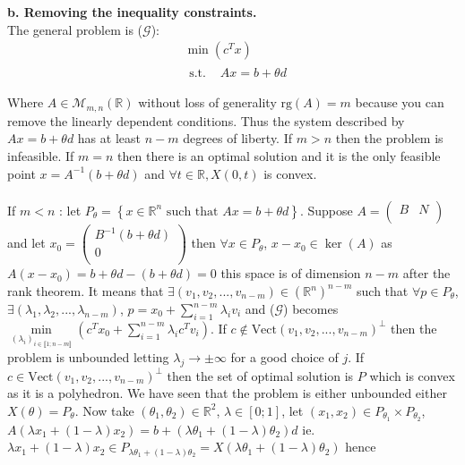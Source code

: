\documentclass{article}
\begin{document}
\textbf{b. Removing the inequality constraints.}\\
The general problem is ($\mathcal{G}$): \begin{equation*}
    \begin{split}
        &\min(c^Tx)\\
        &\begin{split}
            \text{s.t. }& Ax = b+\theta d\\
        \end{split}\\
    \end{split}
\end{equation*}
Where $A\in\mathcal{M}_{m,n}(\mathbb{R})$ without loss of generality $\text{rg}(A) = m$ because you can remove the linearly dependent conditions. Thus the system described by $Ax = b+\theta d$ has at least $n-m$ degrees of liberty. If $m>n$ then the problem is infeasible. If $m=n$ then there is an optimal solution and it is the only feasible point $x = A^{-1}(b+\theta d)$ and $\forall t\in\mathbb{R}, X(0,t)$ is convex.
\\\\
If $m<n$ : let $P_\theta = \left\{x\in\mathbb{R}^n\text{ such that } Ax = b+\theta d\right\}$. Suppose $A = \left(\begin{array}{cc}
    B&N\\
 \end{array}\right)$ and let $x_0 = \left(\begin{array}{c}B^{-1}(b+\theta d)\\0\\\end{array}\right)$ then $\forall x\in P_\theta$, $x-x_0 \in \ker(A)$ as $A(x-x_0) = b+\theta d - (b+\theta d) = 0$ this space is of dimension $n-m$ after the rank theorem. It means that $\exists (v_1,v_2,...,v_{n-m})\in(\mathbb{R}^n)^{n-m}$ such that $\forall p\in P_\theta$, $\exists(\lambda_1,\lambda_2,...,\lambda_{n-m})$, $p = x_0+\sum\limits_{i=1}^{n-m}\lambda_iv_i$ and ($\mathcal{G}$) becomes $\min\limits_{(\lambda_i)_{i\in\llbracket 1;n-m\rrbracket} }(c^Tx_0+\sum\limits_{i=1}^{n-m}\lambda_ic^Tv_i)$. If $c\notin \text{Vect}(v_1,v_2,...,v_{n-m})^\perp$ then the problem is unbounded letting $\lambda_j\to \pm \infty$ for a good choice of $j$. If $c\in \text{Vect}(v_1,v_2,...,v_{n-m})^\perp$ then the set of optimal solution is $P$ which is convex as it is a polyhedron. We have seen that the problem is either unbounded either $X(\theta) = P_\theta$. Now take $(\theta_1,\theta_2) \in \mathbb{R}^2$, $\lambda\in[0;1]$, let $(x_1,x_2)\in P_{\theta_1}\times P_{\theta_2}$, $A(\lambda x_1+(1-\lambda)x_2) = b+(\lambda\theta_1+(1-\lambda)\theta_2)d$ ie. $\lambda x_1+(1-\lambda)x_2\in P_{\lambda\theta_1 + (1-\lambda)\theta_2} = X(\lambda\theta_1 + (1-\lambda)\theta_2)$ hence
\end{document}
